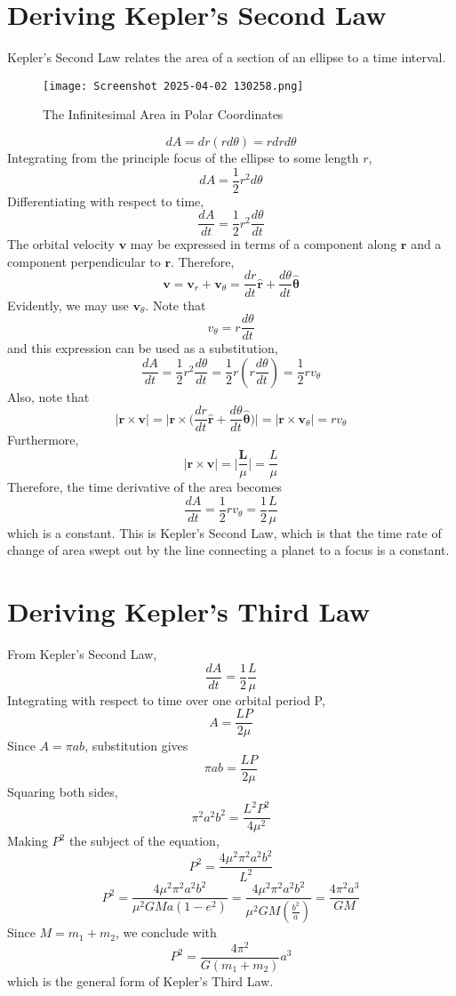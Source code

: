 \documentclass{article}
\begin{document}
\section{Deriving Kepler's Second Law}
Kepler's Second Law relates the area of a section of an ellipse to a time interval.
\begin{figure}
    \centering
    \texttt{[image: Screenshot 2025-04-02 130258.png]}
    \caption{The Infinitesimal Area in Polar Coordinates}
    \label{fig:2}
\end{figure}
$$dA=dr(rd\theta)=rdrd\theta$$
Integrating from the principle focus of the ellipse to some length $r$, 
$$dA=\frac{1}2{r^2}d\theta$$
Differentiating with respect to time, 
$$\frac{dA}{dt}=\frac{1}{2}r^2\frac{d\theta}{dt}$$
The orbital velocity $\textbf{v}$ may be expressed in terms of a component along $\textbf{r}$ and a component perpendicular to $\textbf{r}$. Therefore,
$$\textbf{v}=\textbf{v}_r+\textbf{v}_\theta=\frac{dr}{dt}\bm{\hat{r}}+\frac{d\theta}{dt}\bm{\hat{\theta}}$$
Evidently, we may use $\textbf{v}_\theta$. Note that
$$v_\theta=r\frac{d\theta}{dt}$$
and this expression can be used as a substitution,
$$\frac{dA}{dt}=\frac{1}{2}r^2\frac{d\theta}{dt}=\frac{1}{2}r(r\frac{d\theta}{dt})=\frac{1}{2}rv_\theta$$
Also, note that 
$$|\textbf{r}\times\textbf{v}|=\Bigg|\textbf{r}\times\Bigg(\frac{dr}{dt}\bm{\hat{r}}+\frac{d\theta}{dt}\bm{\hat{\theta}}\Bigg)\Bigg|=|\textbf{r}\times\textbf{v}_\theta|=rv_\theta$$
Furthermore, 
$$|\textbf{r}\times\textbf{v}|=\Bigg|\frac{\textbf{L}}{\mu}\Bigg|=\frac{L}{\mu}$$
Therefore, the time derivative of the area becomes
$$\frac{dA}{dt}=\frac{1}{2}rv_\theta=\frac{1}{2}\frac{L}{\mu}$$
which is a constant. This is Kepler's Second Law, which is that the time rate of change of area swept out by the line connecting a planet to a focus is a constant.
\section{Deriving Kepler's Third Law}
From Kepler's Second Law, 
$$\frac{dA}{dt}=\frac{1}{2}\frac{L}{\mu}$$
Integrating with respect to time over one orbital period P,
$$A=\frac{LP}{2\mu}$$
Since $A=\pi ab$, substitution gives
$$\pi ab=\frac{LP}{2\mu}$$
Squaring both sides,
$$\pi^2a^2b^2=\frac{L^2P^2}{4\mu^2}$$
Making $P^2$ the subject of the equation,
$$P^2=\frac{4\mu^2\pi^2a^2b^2}{L^2}$$
$$P^2=\frac{4\mu^2\pi^2a^2b^2}{\mu^2GMa(1-e^2)}=\frac{4\mu^2\pi^2a^2b^2}{\mu^2GM(\frac{b^2}{a})}=\frac{4\pi^2a^3}{GM}$$
Since $M=m_1+m_2$, we conclude with
$$P^2=\frac{4\pi^2}{G(m_1+m_2)}a^3$$
which is the general form of Kepler's Third Law.
\newpage
\end{document}
